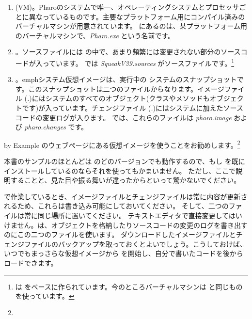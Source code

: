 \documentclass[a4paper,10pt,twoside]{book}
\begin{document}
\begin{enumerate}

  \item {} (VM)。Pharoのシステムで唯一、オペレーティングシステムとプロセッサごとに異なっているものです。主要なプラットフォーム用にコンパイル済みのバーチャルマシンが用意されています。 にあるのは、某プラットフォーム用のバーチャルマシンで、\textit{Pharo.exe} という名前です。

  \item {}。ソースファイルには \pharo の中で、あまり頻繁には変更されない部分のソースコードが入っています。 では \emph{SqueakV39.sources} がソースファイルです。\footnote{\pharo は  をベースに作られています。今のところバーチャルマシンは \squeak と同じものを使っています。}

  \item {}。emph{システム仮想イメージ}は、実行中の \pharo システムのスナップショットです。このスナップショットは二つのファイルからなります。イメージファイル (\emph{.})にはシステムのすべてのオブジェクト(クラスやメソッドもオブジェクトです)が入っています。チェンジファイル (\emph{.})にはシステムに加えたソースコードの変更ログが入ります。
 では、これらのファイルは \emph{pharo.image} および \emph{pharo.changes} です。
\end{enumerate}

\pharo by Example のウェブページにある仮想イメージを使うことをお勧めします。\footnote{\pbe}

本書のサンプルのほとんどは \pharo のどのバージョンでも動作するので、もし \pharo を既にインストールしているのならそれを使ってもかまいません。
ただし、ここで説明することと、見た目や振る舞いが違ったからといって驚かないでください。

\pharo で作業しているとき、イメージファイルとチェンジファイルは常に内容が更新されるため、これらは書き込み可能にしておいてください。
そして、二つのファイルは常に同じ場所に置いてください。
テキストエディタで直接変更してはいけません。\pharo は、オブジェクトを格納したりソースコードの変更のログを書き出すのにこの二つのファイルを使います。
ダウンロードしたイメージファイルとチェンジファイルのバックアップを取っておくとよいでしょう。こうしておけば、いつでもまっさらな仮想イメージから \pharo を開始し、自分で書いたコードを後からロードできます。
\end{document}
